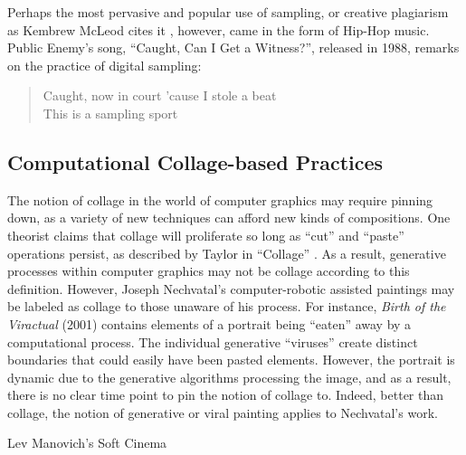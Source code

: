 \documentclass[a4paper,11pt,final]{ThesisStyle}
\begin{document}
Perhaps the most pervasive and popular use of sampling, or creative plagiarism as Kembrew McLeod cites it \cite{McLeod2011}, however, came in the form of Hip-Hop music.  Public Enemy's song, ``Caught, Can I Get a Witness?'', released in 1988, remarks on the practice of digital sampling: 
\begin{verse}
Caught, now in court 'cause I stole a beat\\
This is a sampling sport
\end{verse}


\subsection{Computational Collage-based Practices}

The notion of collage in the world of computer graphics may require pinning down, as a variety of new techniques can afford new kinds of compositions.  One theorist claims that collage will proliferate so long as ``cut'' and ``paste'' operations persist, as described by Taylor in ``Collage'' \cite{}.   As a result, generative processes within computer graphics may not be collage according to this definition.  However, Joseph Nechvatal's computer-robotic assisted paintings may be labeled as collage to those unaware of his process.  For instance, \textit{Birth of the Viractual} (2001) contains elements of a portrait being ``eaten'' away by a computational process.  The individual generative ``viruses'' create distinct boundaries that could easily have been pasted elements.  However, the portrait is dynamic due to the generative algorithms processing the image, and as a result, there is no clear time point to pin the notion of collage to.  Indeed, better than collage, the notion of generative or viral painting applies to Nechvatal's work. 

Lev Manovich's Soft Cinema
\end{document}
